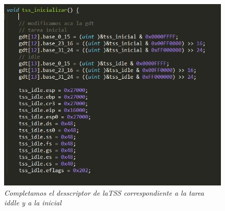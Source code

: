 \begin{figure}[H]
\begin{center}
\includegraphics[width=\linewidth]{ejercicio6/tss_iddle_inicial.png}
\caption{{\small \textit{ Completamos el desscriptor de la\textit{TSS} correspondiente a la tarea iddle y a la inicial}}}
\endminipage
\end{center}
\end{figure}



